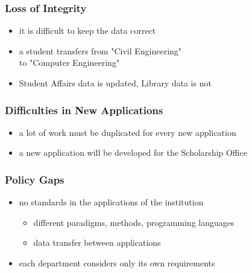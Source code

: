 \documentclass[dvipsnames]{beamer}
\theoremstyle{plain}
\begin{document}
\begin{frame}
  \frametitle{Loss of Integrity}

  \begin{itemize}
    \item it is difficult to keep the data correct
  \end{itemize}

  \pause
  \begin{example}
    \begin{itemize}
      \item a student transfers from "Civil Engineering"\\
	to "Computer Engineering"
      \item Student Affairs data is updated, Library data is not
    \end{itemize}
  \end{example}
\end{frame}

\begin{frame}
  \frametitle{Difficulties in New Applications}

  \begin{itemize}
    \item a lot of work must be duplicated for every new application
  \end{itemize}

  \pause
  \begin{example}
    \begin{itemize}
      \item a new application will be developed for the Scholarship Office
    \end{itemize}
  \end{example}
\end{frame}

\begin{frame}
  \frametitle{Policy Gaps}

  \begin{itemize}
    \item no standards in the applications of the institution
    \begin{itemize}
      \item different paradigms, methods, programming languages
      \item data transfer between applications
    \end{itemize}

    \pause
    \item each department considers only its own requirements
  \end{itemize}
\end{frame}
\end{document}
